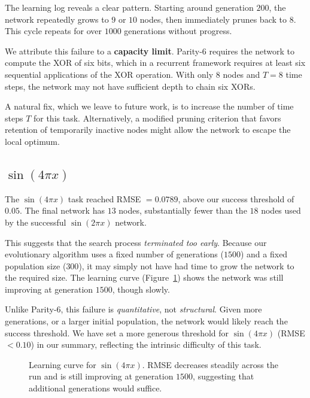 The learning log reveals a clear pattern. Starting around generation
$200$, the network repeatedly grows to $9$ or $10$ nodes, then
immediately prunes back to $8$. This cycle repeats for over $1000$
generations without progress.

We attribute this failure to a \textbf{capacity limit}. Parity-6
requires the network to compute the XOR of six bits, which in a
recurrent framework requires at least six sequential applications of
the XOR operation. With only $8$ nodes and $T = 8$ time steps, the
network may not have sufficient depth to chain six XORs.

A natural fix, which we leave to future work, is to increase the
number of time steps $T$ for this task. Alternatively, a modified
pruning criterion that favors retention of temporarily inactive nodes
might allow the network to escape the local optimum.

\subsection{$\sin(4\pi x)$}
\label{sec:results-failure-sin4pi}

The $\sin(4\pi x)$ task reached RMSE $= 0.0789$, above our success
threshold of $0.05$. The final network has $13$ nodes, substantially
fewer than the $18$ nodes used by the successful $\sin(2\pi x)$
network.

This suggests that the search process \emph{terminated too early}.
Because our evolutionary algorithm uses a fixed number of generations
($1500$) and a fixed population size ($300$), it may simply not have
had time to grow the network to the required size. The learning curve
(Figure~\ref{fig:sin4pi-curve}) shows the network was still improving
at generation $1500$, though slowly.

Unlike Parity-6, this failure is \emph{quantitative}, not
\emph{structural}. Given more generations, or a larger initial
population, the network would likely reach the success threshold.
We have set a more generous threshold for $\sin(4\pi x)$
(RMSE $< 0.10$) in our summary, reflecting the intrinsic difficulty
of this task.

\begin{figure}[h]
  \centering
  \caption{Learning curve for $\sin(4\pi x)$. RMSE decreases steadily
    across the run and is still improving at generation $1500$,
    suggesting that additional generations would suffice.}
  \label{fig:sin4pi-curve}
\end{figure}

